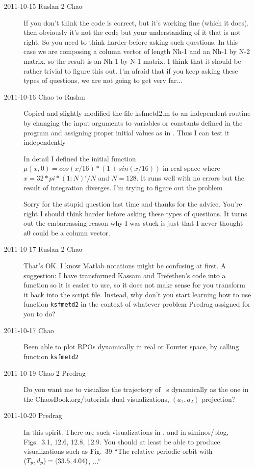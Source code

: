 \begin{description}
\item[2011-10-15 Ruslan 2 Chao]
If you don't think the code is correct, but it's working fine (which it does), then obviously it's not the code but your understanding of it that is not right.  So you need to think harder before asking such questions.  In this case we are composing a column vector of length Nh-1 and an Nh-1 by N-2 matrix, so the result is an Nh-1 by N-1 matrix.  I think that it should be rather trivial to figure this out.  I'm afraid that if you keep asking these types of questions, we are not going to get very far...

\item[2011-10-16 Chao to Ruslan]
Copied and slightly modified the file ksfmetd2.m to an independent routine by changing the input arguments to variables or constants defined in the program and assigning proper initial values as in . Thus I can test it independently

In detail I defined the initial function $\mu(x,0)=cos(x/16)*(1+sin(x/16))$ in real space where $x = 32*pi*(1:N)'/N$ and $N =128$.  It runs well with no errors but the result of integration diverges. I'm trying to figure out the problem

Sorry for the stupid question last time and thanks for the advice. You're right I should think harder before asking these types of questions. It turns out the embarrassing reason why I was stuck is just that I never thought a0 could be a column vector.

\item[2011-10-17 Ruslan 2 Chao]
That's OK.  I know Matlab notations might be confusing at first.  A suggestion: I have transformed Kassam and Trefethen's code into a function so it is easier to use, so it does not make sense for you transform it back into the script file.  Instead, why don't you start learning how to use function \texttt{ksfmetd2} in the context of whatever problem Predrag assigned for you to do?

\item[2011-10-17 Chao] Been able to plot RPOs dynamically in real or Fourier space, by calling function \texttt{ksfmetd2}

\item[2011-10-19 Chao 2 Predrag] Do you want me to visualize the
trajectory of \KS\ \rpo s dynamically as the one in the
ChaosBook.org/\-tutorials dual visualizations, $(a_1,a_2)$
projection?

\item[2011-10-20 Predrag] In this spirit. There are such visualizations
in , and in siminos/blog,
Figs.~3.1, 12.6, 12.8, 12.9. You should at least be able to
produce visualizations such as Fig.~39 ``The relative periodic orbit with $({T_{p}}, d_p) = (33.5, 4.04)$,
...''


\end{description}
